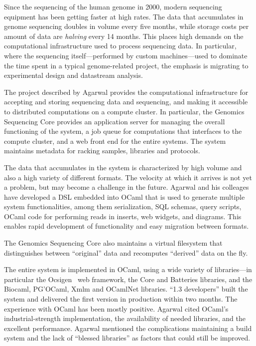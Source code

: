 \documentclass{jfp1}
\begin{document}
Since the sequencing of the human genome in 2000, modern sequencing
equipment has been getting faster at high rates.
The data that accumulates in genome sequencing doubles in volume every five months,
while storage costs per amount of data are {\em halving} every 14 months.
This places high demands on the computational infrastructure used to
process sequencing data.  In particular, where the sequencing
itself---performed by custom machines---used to dominate the time
spent in a typical genome-related project, the emphasis is migrating
to experimental design and datastream analysis.

The project described by Agarwal provides the computational
infrastructure for accepting and storing sequencing data and
sequencing, and making it accessible to distributed computations on a
compute cluster.  In particular, the Genomics Sequencing Core provides
an application server for managing the overall functioning of the
system, a job queue for computations that interfaces to the compute
cluster, and a web front end for the entire systems.  The system
maintains metadata for racking samples, libraries and protocols.

The data that accumulates in the system is characterized by high
volume and also a high variety of different formats. The
velocity at which it arrives is not yet a problem, but may become a
challenge in the future.  Agarwal and his colleages have developed a
DSL embedded into OCaml that is used to generate multiple
system functionalities, among them serialization, SQL schemas, query scripts,
OCaml code for performing reads in inserts, web widgets, and diagrams.
This enables rapid development of functionality and easy migration
between formats.

The Genomics Sequencing Core also maintains a virtual filesystem that
distinguishes between ``original'' data and recomputes ``derived'' data
on the fly.

The entire system is implemented in OCaml, using a wide variety of
libraries---in particular the
Ocsigen~\cite{Balat:2009:ERO:1596550.1596595} web framework, the Core
and Batteries libraries, and the Biocaml, PG'OCaml, Xmlm and OCamlNet
libraries.  ``1.3 developers'' built the system and delivered the
first version in production within two months.  The experience with
OCaml has been mostly positive.  Agarwal cited OCaml's
industrial-strength implementation, the availability of needed
libraries, and the excellent performance.  Agarwal mentioned the
complications maintaining a build system and the lack of ``blessed
libraries'' as factors that could still be improved.
\end{document}
